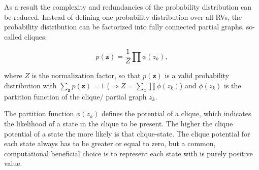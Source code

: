As a result the complexity and redundancies of the probability distribution can be reduced. Instead of defining one probability distribution over all RVs, the probability distribution can be factorized into fully connected partial graphs, so-called cliques:

\[
p(\textbf{z}) = \frac{1}{Z} \prod \phi (z_k)  ,
\]

where $Z$ is the normalization factor, so that $p(\textbf{z})$ is a valid probability distribution with $\sum_{\textbf{z}} p(\textbf{z}) = 1$ ($ \Rightarrow Z = \sum_z \prod \phi (z_k) $) and $\phi (z_k)$ is the partition function of the clique/ partial graph $z_k$.

The partition function $\phi (z_k)$ defines the potential of a clique, which indicates the likelihood of a state in the clique to be present.
The higher the clique potential of a state the more likely is that clique-state.
The clique potential for each state always has to be greater or equal to zero, but a common, computational beneficial choice is to represent each state with is purely positive value.

